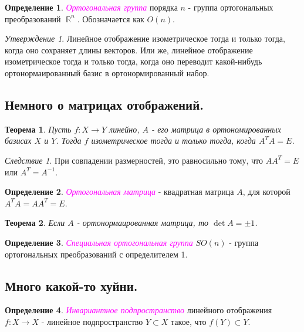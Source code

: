 \documentclass[a4paper,100pt]{article}
\theoremstyle{indented}
\newtheorem{theorem}{Теорема}
\theoremstyle{definition}
\newtheorem{defn}{Определение}
\theoremstyle{remark}
\newtheorem{cons}{Следствие}
\newtheorem{stat}{Утверждение}
\DeclareMathOperator{\ra}{\rightarrow}
\DeclareMathOperator{\RR}{\mathbb{R}}
\begin{document}
\begin{defn}
    \textit{\textcolor{magenta}{\hypertarget{s74}{Ортогональная группа}}} порядка $n$ - группа ортогональных преобразований $\RR^n$. Обозначается как $O(n)$. 
\end{defn}

\begin{stat}
    Линейное отображение изометрическое тогда и только тогда, когда оно сохраняет длины векторов. Или же, линейное отображение изометрическое тогда и только тогда, когда оно переводит какой-нибудь ортонормаированный базис в ортонормированный набор.
\end{stat}

\subsection{Немного о матрицах отображений.}

\begin{theorem}
    Пусть $f:X\ra Y$ линейно, $A$ - его матрица в ортономированных базисах $X$ и $Y$. Тогда $f$ изометрическое тогда и только тогда, когда $A^TA=E$. 
\end{theorem}

\begin{cons}
    При совпадении размерностей, это равносильно тому, что $AA^T=E$ или $A^T=A^{-1}$.
\end{cons}

\begin{defn}
    \textit{\textcolor{magenta}{\hypertarget{s75}{Ортогональная матрица}}} - квадратная матрица $A$, для которой $A^TA=AA^T=E$. 
\end{defn}

\begin{theorem}
    Если $A$ - ортонормаированная матрица, то $\det A = \pm 1$. 
\end{theorem}

\begin{defn}
    \textit{\textcolor{magenta}{\hypertarget{s76}{Специальная ортогональная группа}}} $SO(n)$ - группа ортогональных преобразований с определителем 1.
\end{defn}

\subsection{Много какой-то хуйни.}

\begin{defn}
    \textit{\textcolor{magenta}{\hypertarget{s77}{Инвариантное подпространство}}} линейного отображения $f: X\ra X$ - линейное подпространство $Y\subset X$ такое, что $f(Y)\subset Y$. 
\end{defn}
\end{document}
